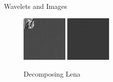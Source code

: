 \documentclass{beamer}
\def\RImageSize{0.2\textwidth}
\def\RImageSpace{\hspace{1cm}}
\begin{document}
\begin{frame}{Wavelets and Images}
\begin{figure}[hbt]
\begin{center}
    \end{center}
  \end{figure}
  \begin{figure}[hbt]
    \begin{center}
      \includegraphics[width=\RImageSize]{lena-2step.jpg}
      \RImageSpace
      \includegraphics[width=\RImageSize]{lena-9step.jpg}
      \caption{Decomposing Lena}
    \end{center}
  \end{figure}

\end{frame}
\end{document}
